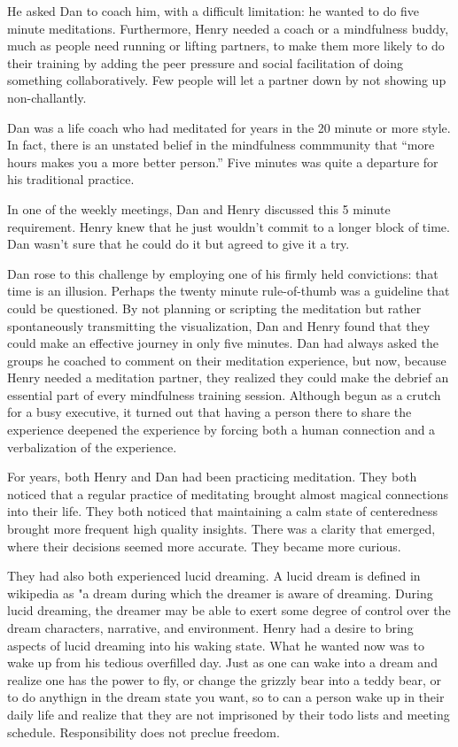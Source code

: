 \documentclass[12pt]{book}
\begin{document}
He asked Dan to coach him, with a difficult limitation: he wanted to do five minute meditations. Furthermore, Henry needed a coach
or a mindfulness buddy, much as people need running or lifting partners, to make them more likely to do their training by adding the peer
pressure and social facilitation of doing something collaboratively. Few people will let a partner down by not showing up non-challantly.

Dan was a life coach who had meditated for years in the
20 minute or more style.  In fact, there is an unstated
belief in the mindfulness commmunity that ``more hours makes
you a more better person.'' Five minutes was quite a
departure for his traditional practice.

In one of the weekly meetings, Dan and Henry discussed this 5 minute requirement. Henry knew that he just wouldn't commit to a longer block of time. Dan wasn't sure that he could do it but agreed to give it a try. 

Dan rose to this challenge by employing one of his firmly held convictions: that time is an illusion.
Perhaps the twenty minute rule-of-thumb was a guideline that could be questioned.
By not planning or scripting the meditation but rather spontaneously transmitting
the visualization, Dan and Henry found that they could
make an effective journey in only five minutes.
Dan had always asked the groups he coached to comment on
their meditation experience, but now, because Henry needed a
meditation partner, they realized they could make the debrief
an essential part of every mindfulness training session.
Although begun as a crutch for a busy executive, it turned
out that having a person there to share the experience deepened
the experience by forcing both a human connection and a verbalization
of the experience.

For years, both Henry and Dan had been practicing meditation. They
both noticed that a regular practice of meditating brought almost
magical connections into their life. They both noticed that
maintaining a calm state of centeredness brought more frequent high
quality insights. There was a clarity that emerged, where their
decisions seemed more accurate. They became more curious.

They had also both experienced lucid dreaming. A lucid dream is
defined in wikipedia as "a dream during which the dreamer is aware of
dreaming. During lucid dreaming, the dreamer may be able to exert some
degree of control over the dream characters, narrative, and
environment. Henry had a desire to bring aspects of lucid dreaming
into his waking state.  What he wanted now was to wake up from his
tedious overfilled day. Just as one can wake into a dream and realize
one has the power to fly, or change the grizzly bear into a teddy
bear, or to do anythign in the dream state you want, so to can a
person wake up in their daily life and realize that they are not
imprisoned by their todo lists and meeting schedule. Responsibility
does not preclue freedom.
\end{document}
